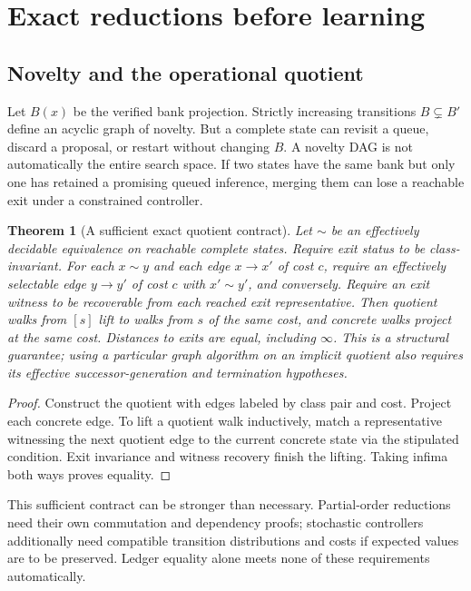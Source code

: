 \documentclass[11pt]{article}
\newtheorem{theorem}{Theorem}[section]\newtheorem{proposition}[theorem]{Proposition}\newtheorem{lemma}[theorem]{Lemma}\newtheorem{corollary}[theorem]{Corollary}
\theoremstyle{definition}\newtheorem{definition}[theorem]{Definition}\newtheorem{example}[theorem]{Example}\newtheorem{conjecture}[theorem]{Conjecture}
\begin{document}
\section{Exact reductions before learning}
\subsection{Novelty and the operational quotient}
Let $B(x)$ be the verified bank projection. Strictly increasing transitions $B\subsetneq B'$ define an acyclic graph of novelty. But a complete state can revisit a queue, discard a proposal, or restart without changing $B$. A novelty DAG is not automatically the entire search space. If two states have the same bank but only one has retained a promising queued inference, merging them can lose a reachable exit under a constrained controller.
\begin{theorem}[A sufficient exact quotient contract]
Let $\sim$ be an effectively decidable equivalence on reachable complete states. Require exit status to be class-invariant. For each $x\sim y$ and each edge $x\to x'$ of cost $c$, require an effectively selectable edge $y\to y'$ of cost $c$ with $x'\sim y'$, and conversely. Require an exit witness to be recoverable from each reached exit representative. Then quotient walks from $[s]$ lift to walks from $s$ of the same cost, and concrete walks project at the same cost. Distances to exits are equal, including $\infty$. This is a structural guarantee; using a particular graph algorithm on an implicit quotient also requires its effective successor-generation and termination hypotheses.
\end{theorem}
\begin{proof} Construct the quotient with edges labeled by class pair and cost. Project each concrete edge. To lift a quotient walk inductively, match a representative witnessing the next quotient edge to the current concrete state via the stipulated condition. Exit invariance and witness recovery finish the lifting. Taking infima both ways proves equality.\end{proof}
This sufficient contract can be stronger than necessary. Partial-order reductions need their own commutation and dependency proofs; stochastic controllers additionally need compatible transition distributions and costs if expected values are to be preserved. Ledger equality alone meets none of these requirements automatically.
\end{document}
